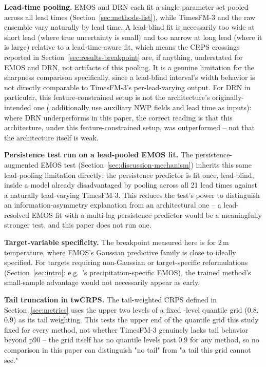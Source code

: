 \textbf{Lead-time pooling.} EMOS and DRN each fit a single parameter set
pooled across all \NLeadTimes{} lead times (Section~\ref{sec:methods-list}),
while TimesFM-3 and the raw ensemble vary naturally by lead time. A
lead-blind fit is necessarily too wide at short lead (where true
uncertainty is small) and too narrow at long lead (where it is large)
relative to a lead-time-aware fit, which means the CRPS crossings reported
in Section~\ref{sec:results-breakpoint} are, if anything, understated for
EMOS and DRN, not artifacts of this pooling. It is a genuine limitation
for the sharpness comparison specifically, since a lead-blind interval's
width behavior is not directly comparable to TimesFM-3's per-lead-varying
output. For DRN in particular, this feature-constrained setup is not the
architecture's originally-intended one (\citealp{rasp_2018_drn} additionally
use auxiliary NWP fields and lead time as inputs): where DRN underperforms
in this paper, the correct reading is that this architecture, under this
feature-constrained setup, was outperformed -- not that the architecture
itself is weak.

\textbf{Persistence test run on a lead-pooled EMOS fit.} The
persistence-augmented EMOS test (Section~\ref{sec:discussion-mechanism})
inherits this same lead-pooling limitation directly: the persistence
predictor is fit once, lead-blind, inside a model already disadvantaged
by pooling across all 21 lead times against a naturally lead-varying
TimesFM-3. This reduces the test's power to distinguish an
information-asymmetry explanation from an architectural one -- a
lead-resolved EMOS fit with a multi-lag persistence predictor would be a
meaningfully stronger test, and this paper does not run one.

\textbf{Target-variable specificity.} The breakpoint measured here is
for \(2\,\mathrm{m}\) temperature, where EMOS's Gaussian predictive
family is close to ideally specified. For targets requiring non-Gaussian
or target-specific reformulations (Section~\ref{sec:intro}: e.g.\
\citealp{scheuerer_2013_precip_emos}'s precipitation-specific EMOS), the
trained method's small-sample advantage would not necessarily appear as
early.

\textbf{Tail truncation in twCRPS.} The tail-weighted CRPS defined in
Section~\ref{sec:metrics} uses the upper two levels of a fixed
\NQuantileLevels{}-level quantile grid (0.8, 0.9) as its tail weighting.
This tests the upper end of the quantile grid this study fixed for every
method, not whether TimesFM-3 genuinely lacks tail behavior beyond p90 --
the grid itself has no quantile levels past 0.9 for any method, so no
comparison in this paper can distinguish "no tail" from "a tail this
grid cannot see."

